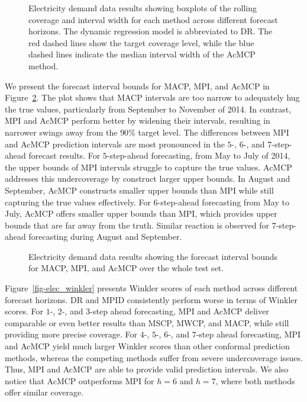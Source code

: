 \documentclass[
  11pt,
  a4paper,
]{article}
\theoremstyle{plain}
\theoremstyle{plain}
\theoremstyle{remark}
\begin{document}
\begin{figure}


\caption{\label{fig-elec_box}Electricity demand data results showing
boxplots of the rolling coverage and interval width for each method
across different forecast horizons. The dynamic regression model is
abbreviated to DR. The red dashed lines show the target coverage level,
while the blue dashed lines indicate the median interval width of the
AcMCP method.}

\end{figure}%

We present the forecast interval bounds for MACP, MPI, and AcMCP in
Figure~\ref{fig-elec_timeplot}. The plot shows that MACP intervals are
too narrow to adequately hug the true values, particularly from
September to November of 2014. In contrast, MPI and AcMCP perform better
by widening their intervals, resulting in narrower swings away from the
\(90\%\) target level. The differences between MPI and AcMCP prediction
intervals are most pronounced in the \(5\)-, \(6\)-, and
\(7\)-step-ahead forecast results. For \(5\)-step-ahead forecasting,
from May to July of 2014, the upper bounds of MPI intervals struggle to
capture the true values. AcMCP addresses this undercoverage by construct
larger upper bounds. In August and September, AcMCP constructs smaller
upper bounds than MPI while still capturing the true values effectively.
For \(6\)-step-ahead forecasting from May to July, AcMCP offers smaller
upper bounds than MPI, which provides upper bounds that are far away
from the truth. Similar reaction is observed for \(7\)-step-ahead
forecasting during August and September.

\begin{figure}


\caption{\label{fig-elec_timeplot}Electricity demand data results
showing the forecast interval bounds for MACP, MPI, and AcMCP over the
whole test set.}

\end{figure}%

Figure~\ref{fig-elec_winkler} presents Winkler scores of each method
across different forecast horizons. DR and MPID consistently perform
worse in terms of Winkler scores. For \(1\)-, \(2\)-, and \(3\)-step
ahead forecasting, MPI and AcMCP deliver comparable or even better
results than MSCP, MWCP, and MACP, while still providing more precise
coverage. For \(4\)-, \(5\)-, \(6\)-, and \(7\)-step ahead forecasting,
MPI and AcMCP yield much larger Winkler scores than other conformal
prediction methods, whereas the competing methods suffer from severe
undercoverage issues. Thus, MPI and AcMCP are able to provide valid
prediction intervals. We also notice that AcMCP outperforms MPI for
\(h=6\) and \(h=7\), where both methods offer similar coverage.
\end{document}
